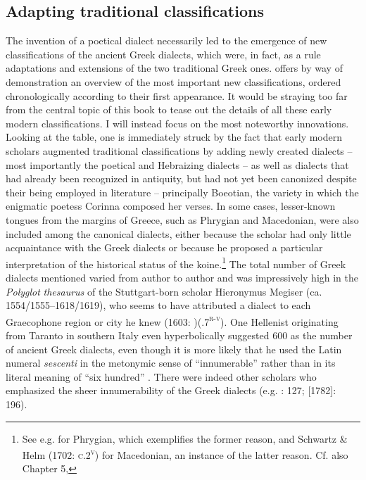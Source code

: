 \subsection{Adapting traditional classifications}
\hypertarget{Toc19704814}{}
The invention of a poetical dialect necessarily led to the emergence of new classifications of the ancient Greek dialects, which were, in fact, as a rule adaptations and extensions of the two traditional Greek ones.  offers by way of demonstration an overview of the most important new classifications, ordered chronologically according to their first appearance. It would be straying too far from the central topic of this book to tease out the details of all these early modern classifications. I will instead focus on the most noteworthy innovations. Looking at the table, one is immediately struck by the fact that early modern scholars augmented traditional classifications by adding newly created dialects – most importantly the poetical and Hebraizing dialects – as well as dialects that had already been recognized in antiquity, but had not yet been canonized despite their being employed in literature – principally Boeotian, the variety in which the enigmatic poetess Corinna composed her verses. In some cases, lesser-known tongues from the margins of Greece, such as Phrygian and Macedonian, were also included among the canonical dialects, either because the scholar had only little acquaintance with the Greek dialects or because he proposed a particular interpretation of the historical status of the koine.\footnote{See e.g. \citet[131]{Kircher1679} for Phrygian, which exemplifies the former reason, and Schwartz \& Helm (1702: \textsc{c.2}\textsc{\textsuperscript{v}}) for Macedonian, an instance of the latter reason. Cf. also Chapter 5, } The total number of Greek dialects mentioned varied from author to author and was impressively high in the \textit{Polyglot} \textit{thesaurus} of the Stuttgart-born scholar Hieronymus Megiser (ca. 1554/1555–1618/1619), who seems to have attributed a dialect to each Graecophone region or city he knew (1603: )(.7\textsc{\textsuperscript{r-v}}). One Hellenist originating from Taranto in southern Italy even hyperbolically suggested 600 as the number of ancient Greek dialects, even though it is more likely that he used the Latin numeral \textit{sescenti} in the metonymic sense of “innumerable” rather than in its literal meaning of “six hundred” \citep[9]{Giovane1589}. There were indeed other scholars who emphasized the sheer innumerability of the Greek dialects (e.g. \citealt{Bischoff1708}: 127; \citealt{Ries1786} [1782]: 196).

